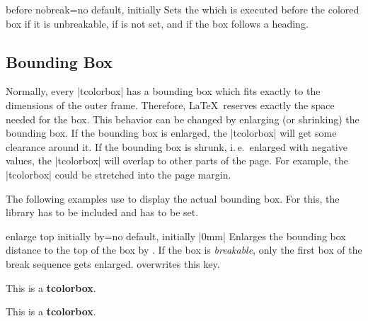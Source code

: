 \begin{docTcbKey}[][doc new=2014-12-16]{before nobreak}{=}{no default, initially }
  Sets the  which is executed before the colored box if it
  is unbreakable, if  is not set, and if
  the box follows a heading.
\end{docTcbKey}


\clearpage
\subsection{Bounding Box}
Normally, every |tcolorbox| has a bounding box which fits exactly to the
dimensions of the outer frame. Therefore, \LaTeX\ reserves exactly the space
needed for the box.
This behavior can be changed by enlarging (or shrinking) the bounding box.
If the bounding box is enlarged, the |tcolorbox| will get some clearance
around it. If the bounding box is shrunk, i.\,e.\ enlarged with negative
values, the |tcolorbox| will overlap to other parts of the page.
For example, the |tcolorbox| could be stretched into the page margin.

\begin{marker}
The following examples use  to display the
actual bounding box. For this, the library  has to be included and
 has to be set.
\end{marker}

\begin{docTcbKey}{enlarge top initially by}{=}{no default, initially |0mm|}
  Enlarges the bounding box distance to the top of the box by .
  If the box is \emph{breakable}, only the first box of the break sequence
  gets enlarged.  overwrites this key.
\begin{dispExample}

\begin{tcolorbox}[enlarge top initially by=-5mm]
This is a \textbf{tcolorbox}.
\end{tcolorbox}
\begin{tcolorbox}[enlarge top initially by=5mm,enhanced,show bounding box]
This is a \textbf{tcolorbox}.
\end{tcolorbox}
\end{dispExample}
\end{docTcbKey}




